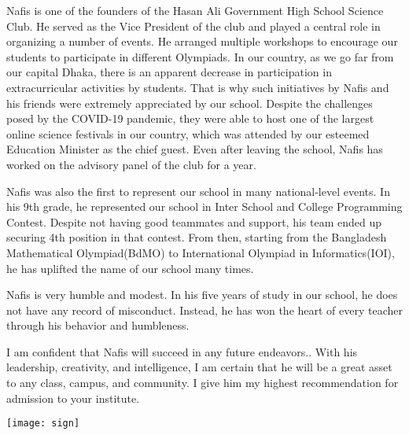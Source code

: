 \documentclass[12pt]{article}
\begin{document}
Nafis is one of the founders of the Hasan Ali Government High School Science Club. He served as the Vice President of the club and played a central role in organizing a number of events. He arranged multiple workshops to encourage our students to participate in different Olympiads. In our country, as we go far from our capital Dhaka, there is an apparent decrease in participation in extracurricular activities by students. That is why such initiatives by Nafis and his friends were extremely appreciated by our school. Despite the challenges posed by the COVID-19 pandemic, they were able to host one of the largest online science festivals in our country, which was attended by our esteemed Education Minister as the chief guest. Even after leaving the school, Nafis has worked on the advisory panel of the club for a year. 

Nafis was also the first to represent our school in many national-level events. In his 9th grade, he represented our school in Inter School and College Programming Contest. Despite not having good teammates and support, his team ended up securing 4th position in that contest. From then, starting from the Bangladesh Mathematical Olympiad(BdMO) to International Olympiad in Informatics(IOI), he has uplifted the name of our school many times.

Nafis is very humble and modest. In his five years of study in our school, he does not have any record of misconduct. Instead, he has won the heart of every teacher through his behavior and humbleness.

I am confident that Nafis will succeed in any future endeavors.. With his leadership, creativity, and intelligence, I am certain that he will be a great asset to any class, campus, and community. I give him my highest recommendation for admission to your institute.




\texttt{[image: sign]}
\end{document}

